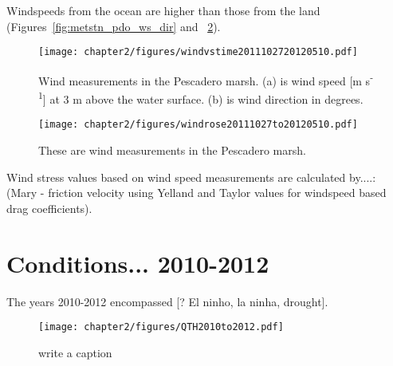 Windspeeds from the ocean are higher than those from the land (Figures~\ref{fig:metstn_pdo_ws_dir} and~
\ref{fig:metstn_pdo_windrose}).

\begin{figure} \centering
\texttt{[image: chapter2/figures/windvstime2011102720120510.pdf]} \caption{Wind 
measurements in the Pescadero marsh. (a) is wind speed [m s\textsuperscript{-1}] at 3
m above the water surface. (b) is wind direction in degrees.}
\label{fig:metstn_pdo_ws_wdir} \end{figure}

 \begin{figure}
 \texttt{[image: chapter2/figures/windrose20111027to20120510.pdf]} \caption{These are wind 
measurements in
 the Pescadero marsh.} \label{fig:metstn_pdo_windrose} \end{figure}


Wind stress values based on wind speed measurements are calculated
by....:  (Mary - friction velocity using Yelland and Taylor values for
windspeed based drag coefficients).

% 
% 
\section{Conditions... 2010-2012} \label{conditions_label}

The years 2010-2012 encompassed [? El ninho, la ninha, drought].



\begin{figure}
\texttt{[image: chapter2/figures/QTH2010to2012.pdf]} 
\caption{write a caption}\label{fig:QTH_2010_2012}  
\end{figure}

